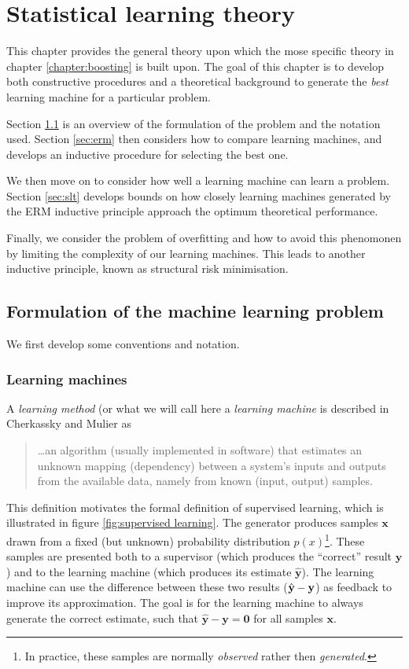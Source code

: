 
\chapter{Statistical learning theory}
\label{chapter:slt}

This chapter provides the general theory upon which the mose specific
theory in chapter \ref{chapter:boosting} is built upon.  The goal of
this chapter is to develop both constructive procedures and a
theoretical background to generate the \emph{best} learning machine
for a particular problem.

Section \ref{sec:formulation} is an overview of the formulation of the
problem and the notation used.  Section \ref{sec:erm} then considers
how to compare learning machines, and develops an inductive procedure
for selecting the best one.

We then move on to consider how well a learning machine can learn a
problem.  Section \ref{sec:slt} develops bounds on how closely
learning machines generated by the ERM inductive principle approach
the optimum theoretical performance.

Finally, we consider the problem of overfitting and how to avoid this
phenomonen by limiting the complexity of our learning machines.  This
leads to another inductive principle, known as structural risk
minimisation.

\section{Formulation of the machine learning problem}
\label{sec:formulation}

We first develop some conventions and notation.

\subsection{Learning machines}
\label{sec:learning machines}
A \emph{learning method} (or what we will call here a \emph{learning
machine} is described in Cherkassky and Mulier \cite{Cherkassky98} as
%
\begin{quote}
	\ldots an algorithm (usually implemented in software) that
	estimates an unknown mapping (dependency) between a system's
	inputs and outputs from the available data, namely from known
	(input, output) samples.
\end{quote}
%
This definition motivates the formal definition of supervised learning,
which is illustrated in figure \ref{fig:supervised learning}.  The generator
produces samples $\mathbf{x}$ drawn from a fixed (but unknown)
probability distribution $p(x)$\footnote{In practice, these samples
are normally \emph{observed} rather then \emph{generated}.}.
These samples are presented both to
a supervisor (which produces the ``correct'' result $\mathbf{y}$) and to the
learning machine (which produces its estimate $\hat{\mathbf{y}}$).  The
learning machine can use the difference between these two results
($\hat{\mathbf{y}} - \mathbf{y}$) as feedback to improve its approximation.  The goal
is for the learning machine to always generate the correct
estimate, such that $\mathbf{\hat{y} - y = 0}$ for all samples $\mathbf{x}$.

